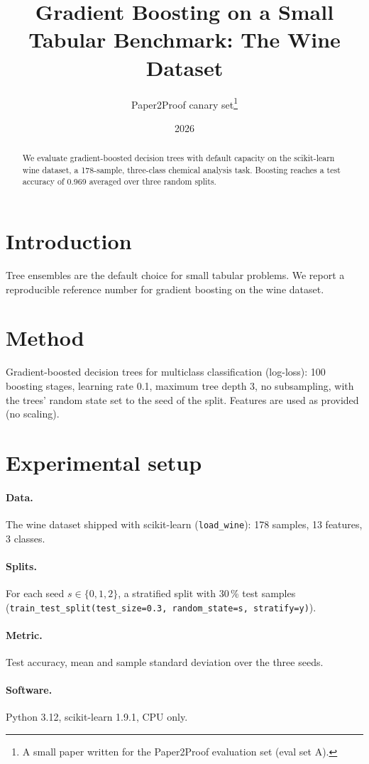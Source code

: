 \documentclass[11pt]{article}
\title{Gradient Boosting on a Small Tabular Benchmark: The Wine Dataset}
\author{Paper2Proof canary set\thanks{A small paper written for the Paper2Proof evaluation set (eval set A).}}
\date{2026}
\begin{document}
\maketitle

\begin{abstract}
We evaluate gradient-boosted decision trees with default capacity on the scikit-learn wine
dataset, a 178-sample, three-class chemical analysis task. Boosting reaches a test accuracy of
0.969 averaged over three random splits.
\end{abstract}

\section{Introduction}
Tree ensembles are the default choice for small tabular problems. We report a reproducible
reference number for gradient boosting on the wine dataset.

\section{Method}
Gradient-boosted decision trees for multiclass classification (log-loss): 100 boosting stages,
learning rate 0.1, maximum tree depth 3, no subsampling, with the trees' random state set to the
seed of the split. Features are used as provided (no scaling).

\section{Experimental setup}
\paragraph{Data.} The wine dataset shipped with scikit-learn (\texttt{load\_wine}): 178 samples,
13 features, 3 classes.
\paragraph{Splits.} For each seed $s \in \{0, 1, 2\}$, a stratified split with 30\,\% test
samples (\texttt{train\_test\_split(test\_size=0.3, random\_state=s, stratify=y)}).
\paragraph{Metric.} Test accuracy, mean and sample standard deviation over the three seeds.
\paragraph{Software.} Python 3.12, scikit-learn 1.9.1, CPU only.
\end{document}

